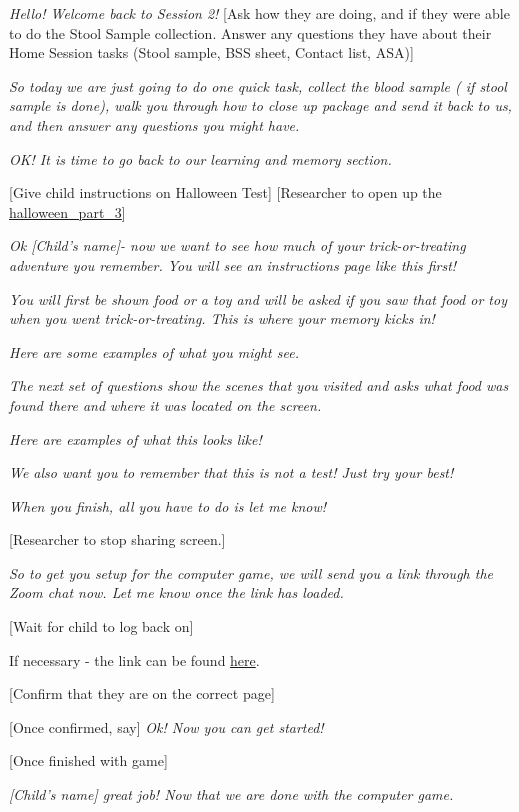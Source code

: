 \documentclass[]{book}
\begin{document}
\emph{Hello! Welcome back to Session 2!} {[}Ask how they are doing, and if they were able to do the Stool Sample collection. Answer any questions they have about their Home Session tasks (Stool sample, BSS sheet, Contact list, ASA){]}

\emph{So today we are just going to do one quick task, collect the blood sample ( if stool sample is done), walk you through how to close up package and send it back to us, and then answer any questions you might have.}

\emph{OK! It is time to go back to our learning and memory section.}

{[}Give child instructions on Halloween Test{]} {[}Researcher to open up the \href{https://ucla.app.box.com/file/737558206552}{halloween\_part\_3}{]}

\emph{Ok {[}Child's name{]}- now we want to see how much of your trick-or-treating adventure you remember. You will see an instructions page like this first!}

\emph{You will first be shown food or a toy and will be asked if you saw that food or toy when you went trick-or-treating. This is where your memory kicks in!}

\emph{Here are some examples of what you might see.}

\emph{The next set of questions show the scenes that you visited and asks what food was found there and where it was located on the screen.}

\emph{Here are examples of what this looks like!}

\emph{We also want you to remember that this is not a test! Just try your best!}

\emph{When you finish, all you have to do is let me know!}

{[}Researcher to stop sharing screen.{]}

\emph{So to get you setup for the computer game, we will send you a link through the Zoom chat now. Let me know once the link has loaded.}

{[}Wait for child to log back on{]}

If necessary - the link can be found \href{https://research.sc/participant/login/20451/publicid}{here}.

{[}Confirm that they are on the correct page{]}

{[}Once confirmed, say{]} \emph{Ok! Now you can get started!}

{[}Once finished with game{]}

\emph{{[}Child's name{]} great job! Now that we are done with the computer game.}
\end{document}
